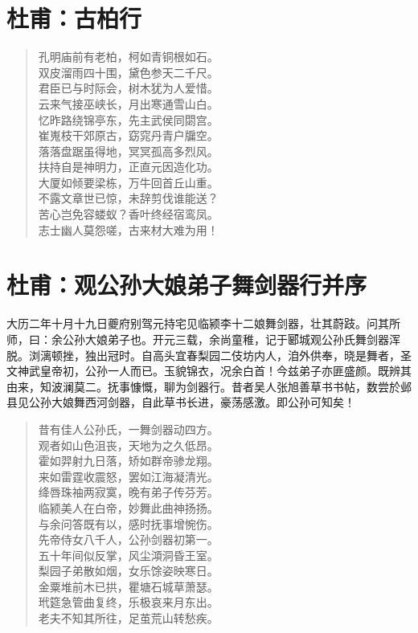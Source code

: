 \documentclass[12pt,oneside]{book}
\newenvironment{shici}{
\begin{verse}
\centering\large\hspace{12pt}}
{\end{verse}}
\begin{document}
\chapter{杜甫：古柏行}
\begin{shici}
孔明庙前有老柏，柯如青铜根如石。\\
双皮溜雨四十围，黛色参天二千尺。\\
君臣已与时际会，树木犹为人爱惜。\\
云来气接巫峡长，月出寒通雪山白。\\
忆昨路绕锦亭东，先主武侯同閟宫。\\
崔嵬枝干郊原古，窈窕丹青户牖空。\\
落落盘踞虽得地，冥冥孤高多烈风。\\
扶持自是神明力，正直元因造化功。\\
大厦如倾要梁栋，万牛回首丘山重。\\
不露文章世已惊，未辞剪伐谁能送？\\
苦心岂免容蝼蚁？香叶终经宿鸾凤。\\
志士幽人莫怨嗟，古来材大难为用！
\end{shici}

\chapter{杜甫：观公孙大娘弟子舞剑器行并序}
大历二年十月十九日夔府别驾元持宅见临颍李十二娘舞剑器，壮其蔚跂。问其所师，曰：余公孙大娘弟子也。开元三载，余尚童稚，记于郾城观公孙氏舞剑器浑脱。浏漓顿挫，独出冠时。自高头宜春梨园二伎坊内人，洎外供奉，晓是舞者，圣文神武皇帝初，公孙一人而已。玉貌锦衣，况余白首！今兹弟子亦匪盛颜。既辨其由来，知波澜莫二。抚事慷慨，聊为剑器行。昔者吴人张旭善草书书帖，数尝於邺县见公孙大娘舞西河剑器，自此草书长进，豪荡感激。即公孙可知矣！

\begin{shici}
昔有佳人公孙氏，一舞剑器动四方。\\
观者如山色沮丧，天地为之久低昂。\\
霍如羿射九日落，矫如群帝骖龙翔。\\
来如雷霆收震怒，罢如江海凝清光。\\
绛唇珠袖两寂寞，晚有弟子传芬芳。\\
临颍美人在白帝，妙舞此曲神扬扬。\\
与余问答既有以，感时抚事增惋伤。\\
先帝侍女八千人，公孙剑器初第一。\\
五十年间似反掌，风尘澒洞昏王室。\\
梨园子弟散如烟，女乐馀姿映寒日。\\
金粟堆前木已拱，瞿塘石城草萧瑟。\\
玳筵急管曲复终，乐极哀来月东出。\\
老夫不知其所往，足茧荒山转愁疾。
\end{shici}
\end{document}
